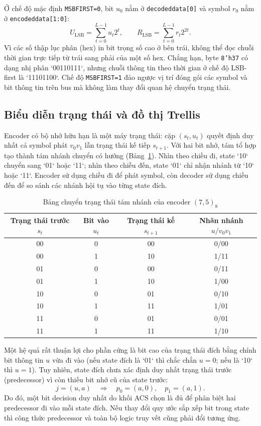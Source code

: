 \documentclass[12pt,a4paper]{article}
\DeclareRobustCommand{\code}[1]{\texttt{#1}}
\renewcommand{\_}{\originalunderscore\allowbreak}
\begin{document}
Ở chế độ mặc định \code{MSB\_FIRST=0}, bit $u_0$ nằm ở \code{decoded\_data[0]} và symbol $r_0$ nằm ở \code{encoded\_data[1:0]}:
\begin{equation}
U_{\mathrm{LSB}}=\sum_{t=0}^{L-1}u_t2^t,\qquad
R_{\mathrm{LSB}}=\sum_{t=0}^{L-1}r_t2^{2t}.
\end{equation}
Vì các số thập lục phân (hex) in bit trọng số cao ở bên trái, không thể đọc chuỗi thời gian trực tiếp từ trái sang phải của một số hex. Chẳng hạn, byte \code{8'h37} có dạng nhị phân `00110111`, nhưng chuỗi thông tin theo thời gian ở chế độ LSB-first là `11101100`. Chế độ \code{MSB\_FIRST=1} đảo ngược vị trí đóng gói các symbol và bit thông tin trên bus mà không làm thay đổi quan hệ chuyển trạng thái.

\subsection{Biểu diễn trạng thái và đồ thị Trellis}
Encoder có bộ nhớ hữu hạn là một máy trạng thái: cặp $(s_t, u_t)$ quyết định duy nhất cả symbol phát $v_0v_1$ lẫn trạng thái kế tiếp $s_{t+1}$. Với hai bit nhớ, tám tổ hợp tạo thành tám nhánh chuyển có hướng (Bảng~\ref{tab:theory-trellis}). Nhìn theo chiều đi, state `10` chuyển sang `01` hoặc `11`; nhìn theo chiều đến, state `01` chỉ nhận nhánh từ `10` hoặc `11`. Encoder sử dụng chiều đi để phát symbol, còn decoder sử dụng chiều đến để so sánh các nhánh hội tụ vào từng state đích.

\begin{table}[H]\centering\small
\begin{tabular}{cccc}\toprule
\textbf{Trạng thái trước $s_t$}&\textbf{Bit vào $u_t$}&\textbf{Trạng thái kế $s_{t+1}$}&\textbf{Nhãn nhánh $u/v_0v_1$}\\\midrule
00&0&00&0/00\\00&1&10&1/11\\01&0&00&0/11\\01&1&10&1/00\\
10&0&01&0/10\\10&1&11&1/01\\11&0&01&0/01\\11&1&11&1/10\\\bottomrule
\end{tabular}
\caption{Bảng chuyển trạng thái tám nhánh của encoder $(7,5)_8$}\label{tab:theory-trellis}
\end{table}

Một hệ quả rất thuận lợi cho phần cứng là bit cao của trạng thái đích bằng chính bit thông tin $u$ vừa đi vào (nếu state đích là `01` thì chắc chắn $u=0$; nếu là `10` thì $u=1$). Tuy nhiên, state đích chưa xác định duy nhất trạng thái trước (predecessor) vì còn thiếu bit nhớ cũ của state trước:
\begin{equation}
j=(u,a)\quad\Longrightarrow\quad
p_0=(a,0),\quad p_1=(a,1).
\end{equation}
Do đó, một bit decision duy nhất do khối ACS chọn là đủ để phân biệt hai predecessor đi vào mỗi state đích. Nếu thay đổi quy ước sắp xếp bit trong state thì công thức predecessor và toàn bộ logic truy vết cũng phải đổi tương ứng.
\end{document}
